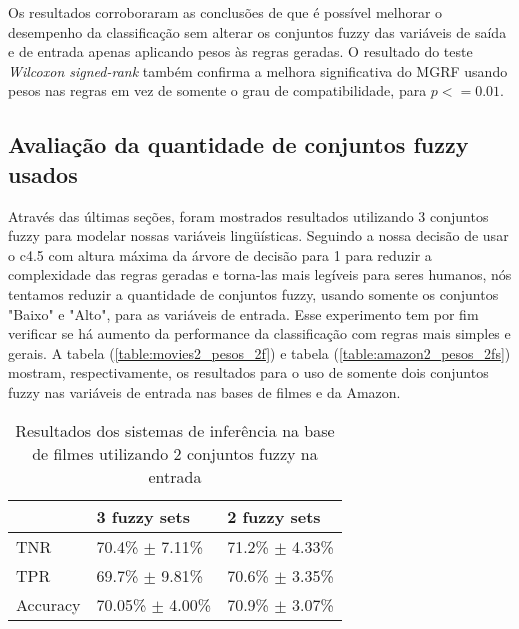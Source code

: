 %
%
%

Os resultados corroboraram as conclusões de \cite{ishibuchi2001effect} que é possível melhorar o desempenho da classificação sem alterar os conjuntos fuzzy das variáveis de saída e de entrada apenas aplicando pesos às regras geradas. O resultado do teste \textit{Wilcoxon signed-rank} também confirma a melhora significativa do MGRF usando pesos nas regras em vez de somente o grau de compatibilidade, para $p <= 0.01$.

\subsection{Avaliação da quantidade de conjuntos fuzzy usados}

Através das últimas seções, foram mostrados resultados utilizando 3 conjuntos fuzzy para modelar nossas variáveis lingüísticas. Seguindo a nossa decisão de usar o c4.5 com altura máxima da árvore de decisão para 1 para reduzir a complexidade das regras geradas e torna-las mais legíveis para seres humanos, nós tentamos reduzir a quantidade de conjuntos fuzzy, usando somente os conjuntos "Baixo" e "Alto", para as variáveis de entrada. Esse experimento tem por fim verificar se há aumento da performance da classificação com regras mais simples e gerais. A tabela (\ref{table:movies2_pesos_2f}) e tabela (\ref{table:amazon2_pesos_2fs}) mostram, respectivamente, os resultados para o uso de somente dois conjuntos fuzzy nas variáveis de entrada nas bases de filmes e da Amazon.

\begin{table}[!h]
    \begin{tabular}{lll}
    ~         		& 3 fuzzy sets 							& 2 fuzzy sets \\ \hline
    TNR 		  	& 70.4\% $\pm$ 7.11\%         & 71.2\% $\pm$ 4.33\%    \\
    TPR    		 & 69.7\% $\pm$ 9.81\%        & 70.6\% $\pm$ 3.35\%   \\
    Accuracy  	 & 70.05\% $\pm$ 4.00\%    	& 70.9\% $\pm$ 3.07\%    \\
    \end{tabular}
    \caption{Resultados dos sistemas de inferência na base de filmes utilizando 2 conjuntos fuzzy na entrada}
	\label{table:movies2_pesos_2fs}
\end{table}

